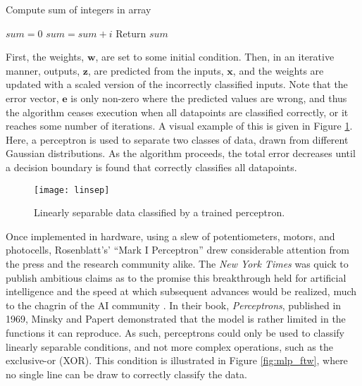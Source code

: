\begin{algorithm}[H]
\caption{Compute sum of integers in array}
\label{array-sum}
\begin{algorithmic}[1]
    \State $sum = 0$
        \State $sum = sum + i$
    \EndFor
    \State Return $sum$
\EndProcedure
\end{algorithmic}
\end{algorithm}

\noindent First, the weights, $\mathbf{w}$, are set to some initial condition.
Then, in an iterative manner, outputs, $\mathbf{z}$, are predicted from the inputs, $\mathbf{x}$, and the weights are updated with a scaled version of the incorrectly classified inputs.
Note that the error vector, $\mathbf{e}$ is only non-zero where the predicted values are wrong, and thus the algorithm ceases execution when all datapoints are classified correctly, or it reaches some number of iterations.
A visual example of this is given in Figure \ref{fig:linsep}.
Here, a perceptron is used to separate two classes of data, drawn from different Gaussian distributions.
As the algorithm proceeds, the total error decreases until a decision boundary is found that correctly classifies all datapoints.

\begin{figure}
\begin{centering}
\texttt{[image: linsep]}
\caption{Linearly separable data classified by a trained perceptron.}
\label{fig:linsep}
\end{centering}
\end{figure}

Once implemented in hardware, using a slew of potentiometers, motors, and photocells, Rosenblatt's' ``Mark I Perceptron'' drew considerable attention from the press and the research community alike.
The \emph{New York Times} was quick to publish ambitious claims as to the promise this breakthrough held for artificial intelligence and the speed at which subsequent advances would be realized, much to the chagrin of the AI community \cite{somebody}.
In their book, \emph{Perceptrons}, published in 1969, Minsky and Papert demonstrated that the model is rather limited in the functions it can reproduce.
As such, perceptrons could only be used to classify linearly separable conditions, and not more complex operations, such as the exclusive-or (XOR).
This condition is illustrated in Figure \ref{fig:mlp_ftw}, where no single line can be draw to correctly classify the data.

